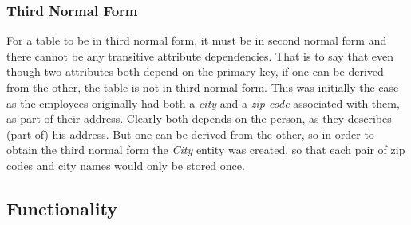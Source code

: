 \subsubsection{Third Normal Form}
For a table to be in third normal form, it must be in second normal form and 
there cannot be any transitive attribute dependencies. That is to say that even 
though two attributes both depend on the primary key, if one can be derived 
from the other, the table is not in third normal form. This was initially the 
case as the employees originally had both a \emph{city} and a \emph{zip code} 
associated with them, as part of their address. Clearly both depends on the 
person, as they describes (part of) his address. But one can be derived from 
the other, so in order to obtain the third normal form the \emph{City} entity 
was created, so that each pair of zip codes and city names would only be stored 
once.


\subsection{Functionality} \label{sec:imp:func} %


